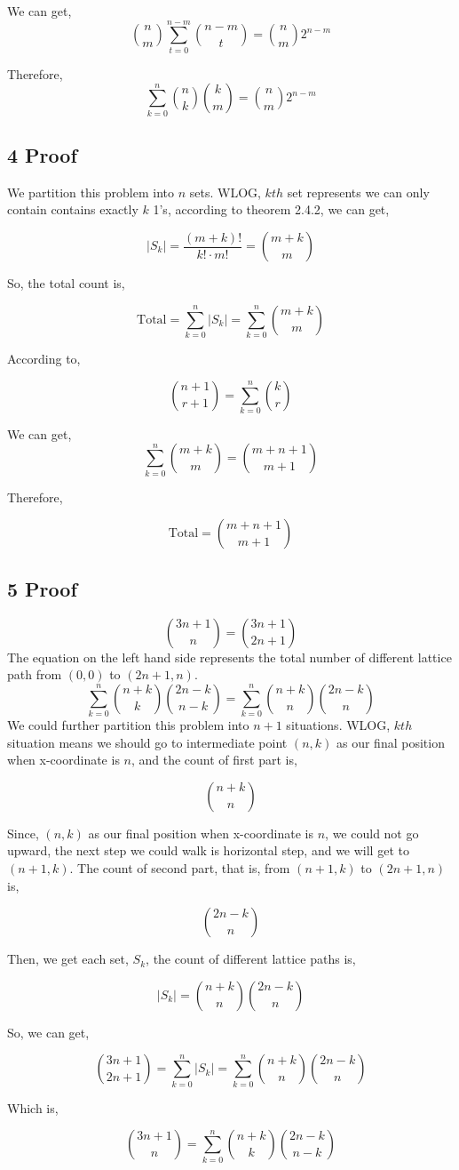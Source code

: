 \documentclass{article}
\begin{document}
We can get,
$${n \choose m} \sum \limits_{t = 0}^{n - m} {{n - m} \choose {t}} = {n \choose m}2^{n - m}$$


Therefore,
$$\sum \limits_{k = 0}^{n} {n \choose k}{k \choose m} = {n \choose m}2^{n - m}$$

\subsection*{4 Proof}
We partition this problem into $n$ sets. WLOG, $kth$ set represents we can only contain contains exactly $k$ 1's, according to theorem 2.4.2, we can get, 

$$|S_k| = \frac{(m + k)!}{k! \cdot m!} = {{m + k} \choose m}$$

So, the total count is,

$$\text{Total} = \sum \limits_{k = 0}^{n} |S_k| =  \sum \limits_{k = 0}^{n} {{m + k} \choose m}$$

According to,

$${{n + 1} \choose {r + 1}} = \sum \limits_{k = 0}^{n} {k \choose r}$$

We can get,
$$\sum \limits_{k = 0}^{n} {{m + k} \choose m} = {{m + n + 1} \choose {m + 1}}$$

Therefore,

$$\text{Total} = {{m + n + 1} \choose {m + 1}}$$
\subsection*{5 Proof}
$${{3n + 1 } \choose {n}} = {{3n+1}\choose{2n+1}}$$
The equation on the left hand side represents the total number of different lattice path from $(0, 0)$ to $(2n+1, n)$.
$$\sum \limits_{k = 0}^{n} {{n+k} \choose k}{{2n-k}\choose{n-k}} = \sum \limits_{k = 0}^{n} {{n+k} \choose n}{{2n-k}\choose{n}}$$
We could further partition this problem into $n + 1$ situations. WLOG, $kth$ situation means we should go to intermediate point $(n, k)$ as our final position when x-coordinate is $n$, and the count of first part is,

$$ {{n+k} \choose n}$$

Since, $(n, k)$ as our final position when x-coordinate is $n$, we could not go upward, the next step we could walk is horizontal step, and we will get to $(n + 1, k)$. The count of second part, that is, from $(n + 1, k)$ to $(2n+1, n)$ is,

 $${{2n-k}\choose{n}}$$

Then, we get each set, $S_k$, the count of different lattice paths is,

$$|S_k| = {{n+k} \choose n}{{2n-k}\choose{n}}$$

So, we can get,

$${{3n+1}\choose{2n+1}} = \sum \limits_{k = 0}^{n} |S_k|  = \sum \limits_{k = 0}^{n}{{n+k} \choose n}{{2n-k}\choose{n}}$$

Which is,

$${{3n + 1 } \choose {n}} =\sum \limits_{k = 0}^{n} {{n+k} \choose k}{{2n-k}\choose{n-k}} $$
\end{document}
